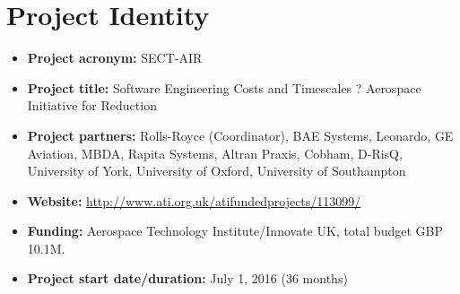 \section{Project Identity}

\newcommand{\bitem}[1]{\item \textbf{#1:}}

\begin{itemize}
	\bitem{Project acronym} SECT-AIR
	\bitem{Project title} Software Engineering Costs and Timescales ? Aerospace Initiative for Reduction
	\bitem{Project partners} Rolls-Royce (Coordinator), BAE Systems, Leonardo, GE Aviation, MBDA, Rapita Systems, Altran Praxis, Cobham, D-RisQ, University of York, University of Oxford, University of Southampton 
	\bitem{Website} \url{http://www.ati.org.uk/atifundedprojects/113099/} 
	\bitem{Funding} Aerospace Technology Institute/Innovate UK, total budget GBP 10.1M.
	\bitem{Project start date/duration} July 1, 2016 (36 months)
\end{itemize}